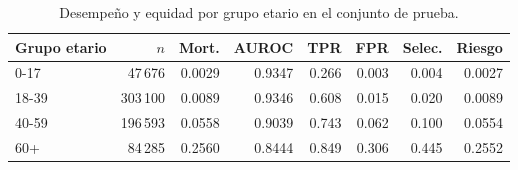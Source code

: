
\begin{table}[htbp]
\centering
\small\setlength{\tabcolsep}{4pt}
\caption{Desempeño y equidad por grupo etario en el conjunto de prueba.}
\label{tab:edad}
\begin{tabular}{l r r r r r r r}
\toprule
Grupo etario & $n$ & Mort. & AUROC & TPR & FPR & Selec. & Riesgo \\
\midrule
0-17 & 47\,676 & 0.0029 & 0.9347 & 0.266 & 0.003 & 0.004 & 0.0027 \\
18-39 & 303\,100 & 0.0089 & 0.9346 & 0.608 & 0.015 & 0.020 & 0.0089 \\
40-59 & 196\,593 & 0.0558 & 0.9039 & 0.743 & 0.062 & 0.100 & 0.0554 \\
60+ & 84\,285 & 0.2560 & 0.8444 & 0.849 & 0.306 & 0.445 & 0.2552 \\
\bottomrule
\end{tabular}
\end{table}
